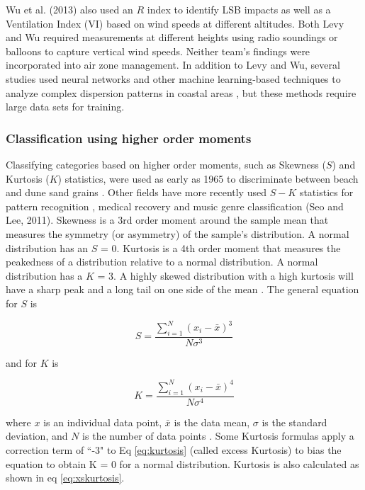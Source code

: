 Wu et al. (2013) also used an $R$ index to identify LSB impacts as well as a Ventilation Index (VI) based on wind speeds at different altitudes.  Both Levy and Wu required measurements at different heights using radio soundings or balloons to capture vertical wind speeds.  Neither team’s findings were incorporated into air zone management.  In addition to Levy and Wu, several studies used neural networks and other machine learning-based techniques to analyze complex dispersion patterns in coastal areas \citep{Elangasinghe2014, Feng2015}, but these methods require large data sets for training. 

\subsubsection{Classification using higher order moments}
Classifying categories based on higher order moments, such as Skewness ($S$) and Kurtosis ($K$) statistics, were used as early as 1965 to discriminate between beach and dune sand grains \citep{Martins1965}.  Other fields have more recently used $S-K$ statistics for pattern recognition \citep{Crosilla2013}, medical recovery \citep{Chi2008} and music genre classification (Seo and Lee, 2011).  Skewness is a 3rd order moment around the sample mean that measures the symmetry (or asymmetry) of the sample’s distribution. A normal distribution has an $S$ = 0. Kurtosis is a 4th order moment that measures the peakedness of a distribution relative to a normal distribution. A normal distribution has a $K$ = 3. A highly skewed distribution with a high kurtosis will have a sharp peak and a long tail on one side of the mean \citep{NIST2013}.  The general equation for $S$ is

\begin{equation}
\label{eq:skewness}
S = \frac{\sum_{i=1}^{N}\left (x_{i}-\bar{x} \right )^{3}}{N\sigma^{3}}
\end{equation}

\noindent
and for $K$ is 

\begin{equation}
\label{eq:kurtosis}
K = \frac{\sum_{i=1}^{N}\left (x_{i}-\bar{x} \right )^{4}}{N\sigma^{4}}
\end{equation}

\noindent
where $x$ is an individual data point, $\bar{x}$ is the data mean, $\sigma$ is the standard deviation, and $N$ is the number of data points \citep{Cristelli2012}.    Some Kurtosis formulas apply a correction term of ``-3" to Eq \ref{eq:kurtosis} (called excess Kurtosis) to bias the equation to obtain K = 0 for a normal distribution.  Kurtosis is also calculated as shown in eq \ref{eq:xskurtosis}.

